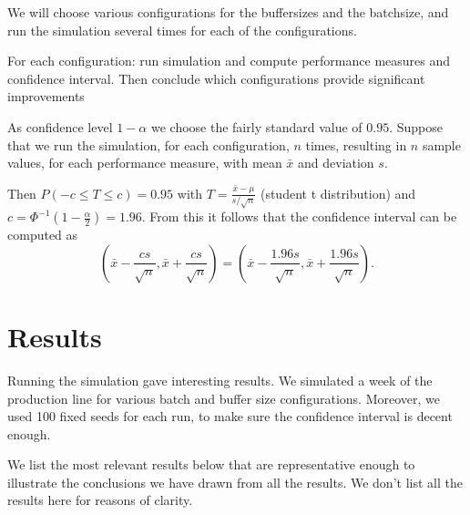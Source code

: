 \documentclass{report}
\begin{document}
We will choose various configurations for the buffersizes and the batchsize, and run the simulation several times for each of the configurations.

For each configuration: run simulation and compute performance measures and confidence interval.
Then conclude which configurations provide significant improvements


As confidence level $1 - \alpha$ we choose the fairly standard value of $0.95$.
Suppose that we run the simulation, for each configuration, $n$ times, resulting in $n$ sample values, for each performance measure, with mean $\bar{x}$ and deviation $s$.

Then $P(-c \leq T \leq c) = 0.95 $ with $T = \frac{\bar{x} - \mu}{s/\sqrt{n}}$ (student t distribution) and $c = \Phi ^{-1} (1 - \frac{\alpha}{2})= 1.96$.
From this it follows that the confidence interval can be computed as
\[ (\bar{x} - \frac{cs}{\sqrt{n}}, \bar{x} + \frac{cs}{\sqrt{n}}) =
(\bar{x} - \frac{1.96s}{\sqrt{n}}, \bar{x} + \frac{1.96s}{\sqrt{n}}). \]


\section{Results}
Running the simulation gave interesting results.
We simulated a week of the production line for various batch and buffer size configurations.
Moreover, we used 100 fixed seeds for each run, to make sure the confidence interval is decent enough.

We list the most relevant results below that are representative enough to illustrate the conclusions we have drawn from all the results. We don't list all the results here for reasons of clarity.
\end{document}

